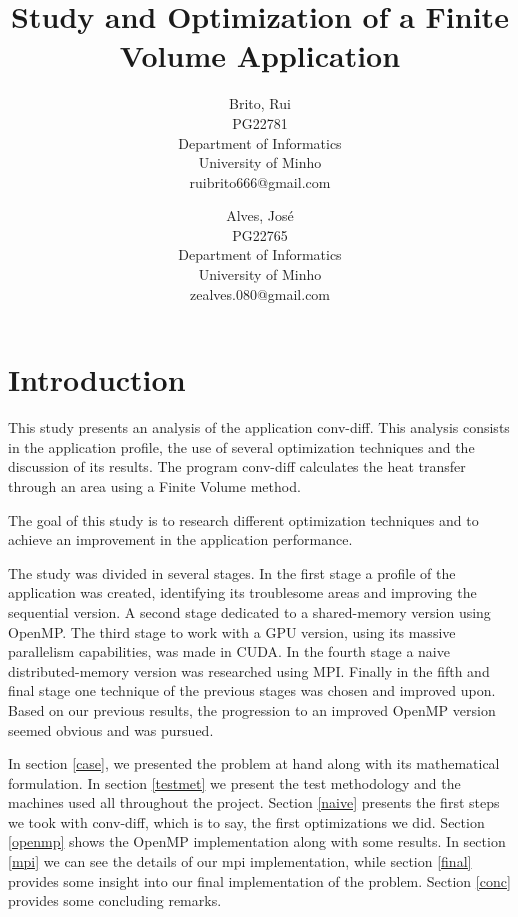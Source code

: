 \documentclass[a4paper,10pt,openright,openbib,twocolumn]{article}
\begin{document}
\begin{multicols}{2}
\title{Study and Optimization of a Finite Volume Application}
\author{
    Brito, Rui\\
    PG22781\\
    Department of Informatics\\
    University of Minho\\
    ruibrito666@gmail.com
  \and
    Alves, José\\
    PG22765\\
    Department of Informatics\\
    University of Minho\\
    zealves.080@gmail.com
}
\date{}
\maketitle
\end{multicols}

\section{Introduction}

This study presents an analysis of the application conv-diff. This analysis consists in the application profile, the use of several optimization techniques and the discussion of its results.
The program conv-diff calculates the heat transfer through an area using a Finite Volume method.

The goal of this study is to research different optimization techniques and to achieve an improvement in the application performance.

The study was divided in several stages.
In the first stage a profile of the application was created, identifying its troublesome areas and improving the sequential version.
A second stage dedicated to a shared-memory version using OpenMP.
The third stage to work with a GPU version, using its massive parallelism capabilities, was made in CUDA.
In the fourth stage a naive distributed-memory version was researched using MPI.
Finally in the fifth and final stage one technique of the previous stages was chosen and improved upon. Based on our previous results, the progression to an improved OpenMP version seemed obvious and was pursued.


In section \ref{case}, we presented the problem at hand along with its mathematical formulation. In section \ref{testmet} we present the test methodology and the machines used all throughout the project. Section \ref{naive} presents the first steps we took with conv-diff, which is to say, the first optimizations we did. Section \ref{openmp} shows the OpenMP implementation along with some results. In section \ref{mpi} we can see the details of our mpi implementation, while section \ref{final} provides some insight into our final implementation of the problem. Section \ref{conc} provides some concluding remarks. 
\end{document}
